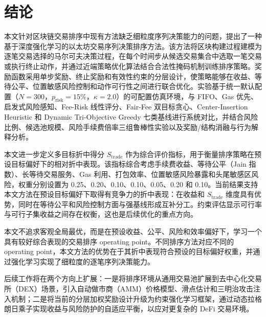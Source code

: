 
\section{结论}

本文针对区块链交易排序中现有方法缺乏细粒度序列决策能力的问题，提出了一种基于深度强化学习的以太坊交易序列决策排序方法。该方法将区块构建过程建模为逐笔交易选择的马尔可夫决策过程，在每个时间步从候选交易集合中选取一笔交易或执行终止动作，并通过近端策略优化算法结合合法性掩码机制训练排序策略。奖励函数采用单步奖励、终止奖励和有效性约束的分层设计，使策略能够在收益、等待公平、位置敏感风险控制和动作可行性之间进行联合优化。实验基于统一默认配置（$N{=}300$，$p_{\text{risk}}{=}15\%$，$\kappa{=}2.0$）的可配置仿真环境，与 FIFO、Gas 优先、启发式风险感知、Fee-Risk 线性评分、Fair-Fee 双目标贪心、Center-Insertion Heuristic 和 Dynamic Tri-Objective Greedy 七类基线进行系统对比，并结合风险比例、候选池规模、风险手续费倍率三组鲁棒性实验以及奖励/结构消融与行为解释分析。

本文进一步定义多目标折中得分 $S_{\text{trade}}$ 作为综合评价指标，用于衡量排序策略在预设目标偏好下的相对折中表现。该指标综合考虑手续费收益、等待公平（Jain 指数）、长等待交易服务、Gas 利用、打包效率、位置敏感风险暴露和头尾敏感区风险，权重分别设置为 0.25、0.20、0.10、0.10、0.05、0.20 和 0.10。当前结果支持本文方法在预设目标偏好下取得有竞争力的折中表现：在收益和 $S_{\text{trade}}$ 维度具有优势，同时在等待公平和风险控制方面与强基线形成互补分工。约束评估显示可行率与可行子集收益之间存在权衡，这也是后续优化的重点方向。

本文不追求客观全局最优，而是在预设收益、公平、风险和效率偏好下，学习一个具有较好综合表现的交易排序 operating point。不同排序方法对应不同的 operating point，本文方法的优势在于其折中表现符合预设的目标偏好权重，并通过强化学习实现了细粒度的逐笔序列决策能力。

后续工作将在两个方向上扩展：一是将排序环境从通用交易池扩展到去中心化交易所（DEX）场景，引入自动做市商（AMM）价格模型、滑点估计和三明治攻击注入机制；二是将当前的分层加权奖励设计升级为约束强化学习框架，通过动态拉格朗日乘子实现收益与风险防护的自适应平衡，以应对更复杂的 DeFi 交易环境。
